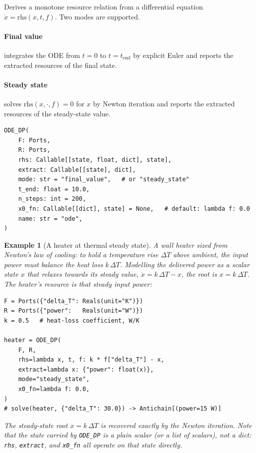\documentclass[11pt,a4paper]{article}
\newtheorem{example}[definition]{Example}
\begin{document}
Derives a monotone resource relation from a differential equation
$\dot x = \text{rhs}(x, t, f)$. Two modes are supported.

\paragraph{Final value} integrates the ODE from $t = 0$ to
$t = t_{\text{end}}$ by explicit Euler and reports the extracted
resources of the final state.

\paragraph{Steady state} solves $\text{rhs}(x, \cdot, f) = 0$ for $x$
by Newton iteration and reports the extracted resources of the
steady-state value.

\begin{lstlisting}
ODE_DP(
    F: Ports,
    R: Ports,
    rhs: Callable[[state, float, dict], state],
    extract: Callable[[state], dict],
    mode: str = "final_value",   # or "steady_state"
    t_end: float = 10.0,
    n_steps: int = 200,
    x0_fn: Callable[[dict], state] = None,   # default: lambda f: 0.0
    name: str = "ode",
)
\end{lstlisting}

\begin{example}[A heater at thermal steady state]
A wall heater sized from Newton's law of cooling: to hold a temperature
rise $\Delta T$ above ambient, the input power must balance the heat loss
$k\,\Delta T$. Modelling the delivered power as a scalar state $x$ that
relaxes towards its steady value, $\dot x = k\,\Delta T - x$, the root is
$x = k\,\Delta T$. The heater's resource is that steady input power:
\begin{lstlisting}
F = Ports({"delta_T": Reals(unit="K")})
R = Ports({"power":   Reals(unit="W")})
k = 0.5   # heat-loss coefficient, W/K

heater = ODE_DP(
    F, R,
    rhs=lambda x, t, f: k * f["delta_T"] - x,
    extract=lambda x: {"power": float(x)},
    mode="steady_state",
    x0_fn=lambda f: 0.0,
)
# solve(heater, {"delta_T": 30.0}) -> Antichain[(power=15 W)]
\end{lstlisting}
The steady-state root $x = k\,\Delta T$ is recovered exactly by the
Newton iteration. Note that the state carried by \texttt{ODE\_DP} is a
plain scalar (or a list of scalars), not a dict: \texttt{rhs},
\texttt{extract}, and \texttt{x0\_fn} all operate on that state directly.
\end{example}
\end{document}
